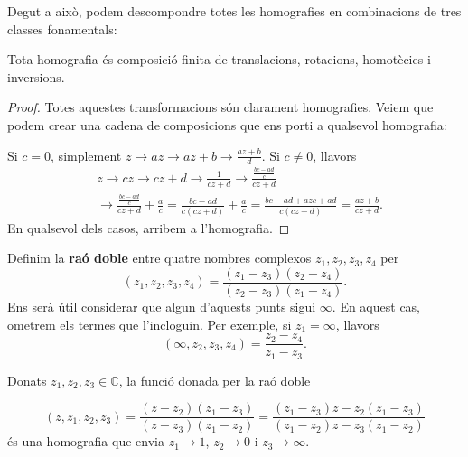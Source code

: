 \documentclass[dvipsnames, svgnames, leqno, a4paper, 12pt]{article}
\begin{document}
        Degut a això, podem descompondre totes les homografies en combinacions de tres classes fonamentals:
        
        \begin{theorem}
            Tota homografia és composició finita de translacions, rotacions, homotècies i inversions.
        \end{theorem}
        
        \begin{proof}
            Totes aquestes transformacions són clarament homografies. Veiem que podem crear una cadena de composicions que ens porti a qualsevol homografia:
            
            Si $c=0$, simplement $z\to az\to az+b\to \frac{az+b}{d}$. Si $c\neq0$, llavors 
            \begin{align*}
                &z\to cz\to cz+d\to \frac{1}{cz+d}\to \frac{\frac{bc-ad}{c}}{cz+d}\\
                &\to \frac{\frac{bc-ad}{c}}{cz+d}+\frac{a}{c}=\frac{bc-ad}{c(cz+d)}+\frac{a}{c}=\frac{bc-ad+azc+ad}{c(cz+d)}=\frac{az+b}{cz+d}.
            \end{align*}
            En qualsevol dels casos, arribem a l'homografia.
        \end{proof}

        \noindent Definim la \textbf{raó doble} entre quatre nombres complexos $z_1,z_2,z_3,z_4$ per 
        \begin{displaymath}
                (z_1,z_2,z_3,z_4) = \frac{(z_1-z_3)(z_2-z_4)}{(z_2-z_3)(z_1-z_4)}.
        \end{displaymath}
        Ens serà útil considerar que algun d'aquests punts sigui $\infty$. En aquest cas, ometrem els termes que l'incloguin. Per exemple, si $z_1 = \infty$, llavors 
        \begin{displaymath}
                (\infty, z_2,z_3,z_4) = \frac{z_2-z_4}{z_1-z_3}.
        \end{displaymath}

        \noindent Donats $z_1,z_2,z_3\in\mathbb{C}$, la funció donada per la raó doble 
        
        \begin{equation}\label{eq:rao_doble}
            (z,z_1,z_2,z_3) = \frac{(z-z_2)(z_1-z_3)}{(z-z_3)(z_1-z_2)}=\frac{(z_1-z_3)z-z_2(z_1-z_3)}{(z_1-z_2)z-z_3(z_1-z_2)}
        \end{equation}
        és una homografia que envia $z_1\to1$, $z_2\to0$ i $z_3\to\infty$.
\end{document}
